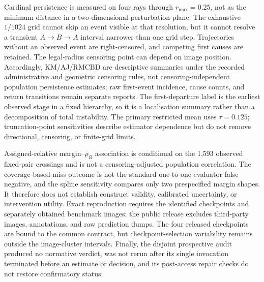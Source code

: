 Cardinal persistence is measured on four rays through $r_{\max}=0.25$, not as the minimum distance in a two-dimensional perturbation plane. The exhaustive $1/1024$ grid cannot skip an event visible at that resolution, but it cannot resolve a transient $A\rightarrow B\rightarrow A$ interval narrower than one grid step. Trajectories without an observed event are right-censored, and competing first causes are retained. The legal-radius censoring point can depend on image position. Accordingly, KM/AJ/RMCBD are descriptive summaries under the recorded administrative and geometric censoring rules, not censoring-independent population persistence estimates; raw first-event incidence, cause counts, and return transitions remain separate reports. The first-departure label is the earliest observed stage in a fixed hierarchy, so it is a localisation summary rather than a decomposition of total instability. The primary restricted mean uses $\tau=0.125$; truncation-point sensitivities describe estimator dependence but do not remove directional, censoring, or finite-grid limits.

Assigned-relative margin--$\rho_R$ association is conditional on the 1,593 observed fixed-pair crossings and is not a censoring-adjusted population correlation. The coverage-based-miss outcome is not the standard one-to-one evaluator false negative, and the spline sensitivity compares only two prespecified margin shapes. It therefore does not establish construct validity, calibrated uncertainty, or intervention utility. Exact reproduction requires the identified checkpoints and separately obtained benchmark images; the public release excludes third-party images, annotations, and raw prediction dumps. The four released checkpoints are bound to the common contract, but checkpoint-selection variability remains outside the image-cluster intervals. Finally, the disjoint prospective audit produced no normative verdict, was not rerun after its single invocation terminated before an estimate or decision, and its post-access repair checks do not restore confirmatory status.
